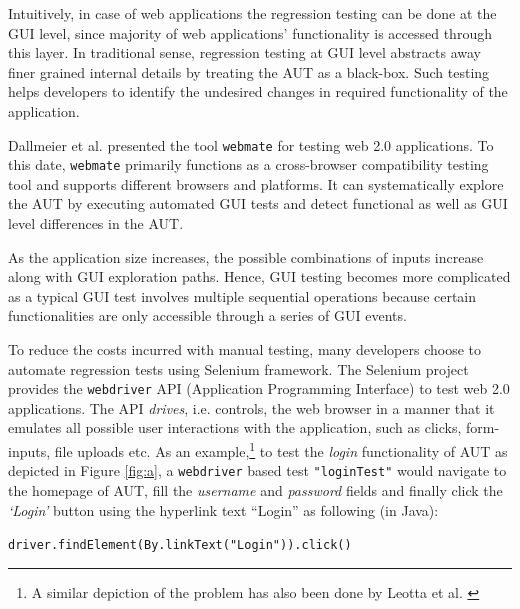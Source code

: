 Intuitively, in case of web applications the regression testing can be done at the GUI level, since majority of web applications’ functionality is accessed through this layer. In traditional sense, regression testing at GUI level abstracts away finer grained internal details by treating the AUT as a black-box. Such testing helps developers to identify the undesired changes in required functionality of the application.

Dallmeier et al. \cite{webmate} presented the tool \texttt{webmate} for testing web 2.0 applications. To this date, \texttt{webmate} primarily functions as a cross-browser compatibility testing tool and supports different browsers and platforms. It can systematically explore the AUT by executing automated GUI tests and detect functional as well as GUI level differences in the AUT. 

As the application size increases, the possible combinations of inputs increase along with GUI exploration paths. Hence, GUI testing becomes more complicated as a typical GUI test involves multiple sequential operations because certain functionalities are only accessible through a series of GUI events.

To reduce the costs incurred with manual testing, many developers choose to automate regression tests using Selenium \cite{websiteSelenium} framework. The Selenium project provides the \texttt{webdriver} API (Application Programming Interface) to test web 2.0 applications. The API \textit{drives}, i.e. controls, the web browser in a manner that it emulates all possible user interactions with the application, such as clicks, form-inputs, file uploads etc. 
As an example,\footnote{A similar depiction of the problem has also been done by Leotta et al. \cite{leotta2013comparing}} to test the \textit{login} functionality of AUT as depicted in Figure \ref{fig:a}, a \texttt{webdriver} based test \texttt{"loginTest"} would navigate to the homepage of AUT, fill the \textit{username} and \textit{password} fields and finally click the \textit{`Login'} button using the hyperlink text ``Login'' as following (in Java):
\begin{small}
\texttt{driver.findElement(By.linkText("Login")).click()}
\end{small}



